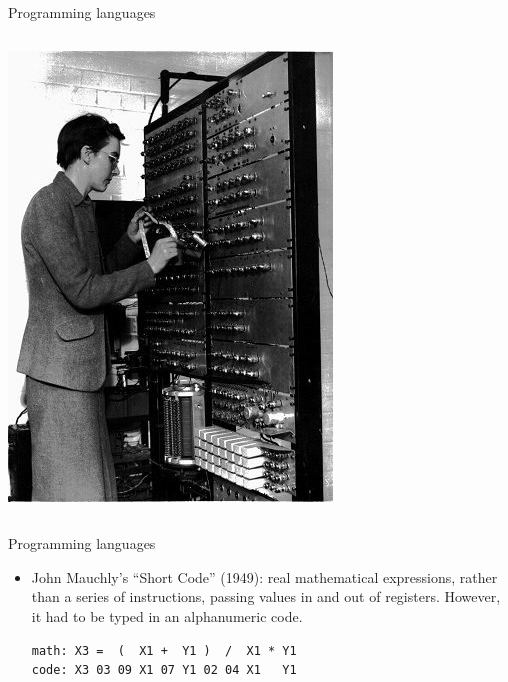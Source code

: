 \documentclass[aspectratio=169]{beamer}
\begin{document}
\begin{frame}{Programming languages}
\begin{itemize}
\begin{columns}
\includegraphics[width=\linewidth]{PLOTS/kathleen-booth.jpg}
\end{columns}
\end{itemize}
\end{frame}

\begin{frame}[fragile]{Programming languages}
\vspace{0.35 cm}
\begin{itemize}\setlength{\itemsep}{0.35 cm}
\item John Mauchly's ``Short Code'' (1949): real mathematical expressions, rather than a series of instructions, passing values in and out of registers. However, it had to be typed in an alphanumeric code.

\vspace{0.5 cm}
\begin{minipage}{0.8\linewidth}
\begin{verbatim}
math: X3 =  (  X1 +  Y1 )  /  X1 * Y1
code: X3 03 09 X1 07 Y1 02 04 X1   Y1
\end{verbatim}
\end{minipage}

\vspace{0.5 cm}
\end{itemize}
\end{frame}
\end{document}

